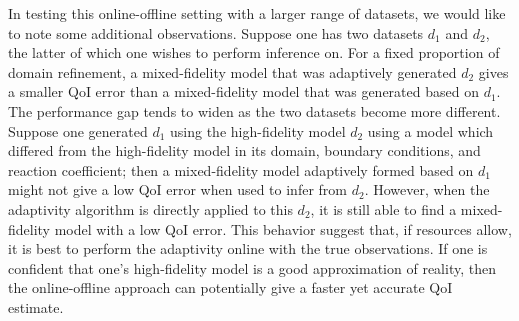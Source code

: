In testing this online-offline setting with a larger range of datasets, we would like to note some additional observations. Suppose one has two datasets $d_1$ and $d_2$, the latter of which one wishes to perform inference on. For a fixed proportion of domain refinement, a mixed-fidelity model that was adaptively generated $d_2$ gives a smaller QoI error than a mixed-fidelity model that was generated based on $d_1$. The performance gap tends to widen as the two datasets become more different. Suppose one generated $d_1$ using the high-fidelity model $d_2$ using a model which differed from the high-fidelity model in its domain, boundary conditions, and reaction coefficient; then a mixed-fidelity model adaptively formed based on $d_1$ might not give a low QoI error when used to infer from $d_2$. However, when the adaptivity algorithm is directly applied to this $d_2$, it is still able to find a mixed-fidelity model with a low QoI error. This behavior suggest that, if resources allow, it is best to perform the adaptivity online with the true observations. If one is confident that one's high-fidelity model is a good approximation of reality, then the online-offline approach can potentially give a faster yet accurate QoI estimate.
